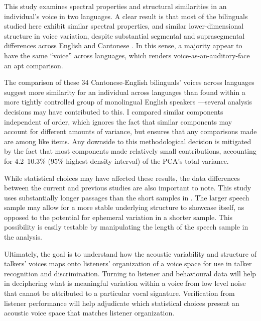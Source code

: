 This study examines spectral properties and structural similarities in an individual's voice in two languages. A clear result is that most of the bilinguals studied here exhibit similar spectral properties, and similar lower-dimensional structure in voice variation, despite substantial segmental and suprasegmental differences across English and Cantonese \citep{matthews_2013_cantonese}. In this sense, a majority appear to have the same ``voice'' across languages, which renders voice-as-an-auditory-face an apt comparison.

The comparison of these 34 Cantonese-English bilinguals' voices across languages suggest more similarity for an individual across languages than found within a more tightly controlled group of monolingual English speakers \citep{lee_2019_acoustic}---several analysis decisions may have contributed to this. I compared similar components independent of order, which ignores the fact that similar components may account for different amounts of variance, but ensures that any comparisons made are among like items. Any downside to this methodological decision is mitigated by the fact that most components made relatively small contributions, accounting for 4.2--10.3\% (95\% highest density interval) of the PCA's total variance. 

While statistical choices may have affected these results, the data differences between the current and previous studies are also important to note. This study uses substantially longer passages than the short samples in \citet{lee_2019_acoustic}. The larger speech sample may allow for a more stable underlying structure to showcase itself, as opposed to the potential for ephemeral variation in a shorter sample. This possibility is easily testable by manipulating the length of the speech sample in the analysis.

Ultimately, the goal is to understand how the acoustic variability and structure of talkers' voices maps onto listeners' organization of a voice space for use in talker recognition and discrimination. Turning to listener and behavioural data will help in deciphering what is meaningful variation within a voice from low level noise that cannot be attributed to a particular vocal signature. Verification from listener performance will help adjudicate which statistical choices present an acoustic voice space that matches listener organization. 

\endinput %

